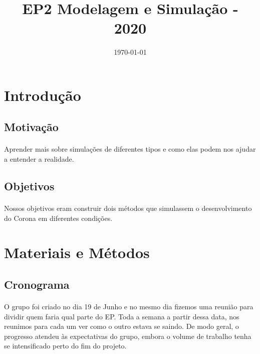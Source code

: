 \documentclass[11pt]{article}
\date{\today}
\title{EP2 Modelagem e Simulação - 2020}
\begin{document}
\maketitle
\tableofcontents

\newpage

\section{Introdução}
\label{sec:org35aea3a}
\subsection{Motivação}
\label{sec:orgdf8d0ac}
\paragraph{} Aprender mais sobre simulações de diferentes tipos e 
como elas podem nos ajudar a entender a realidade.
\subsection{Objetivos}
\label{sec:org92aee02}
\paragraph{} Nossos objetivos eram construir dois métodos que simulassem o
desenvolvimento do Corona em diferentes condições.
\section{Materiais e Métodos}
\label{sec:org8712428}
\subsection{Cronograma}
\label{sec:org0c3902b}
\paragraph{} O grupo foi criado no dia 19 de Junho e 
no mesmo dia fizemos uma reunião para 
dividir quem faria qual parte do EP.
Toda a semana a partir dessa data, 
nos reunimos para cada um ver como o 
outro estava se saindo. De modo geral, o progresso atendeu às expectativas do grupo,
embora o volume de trabalho tenha se intensificado perto do fim do projeto.
\end{document}
